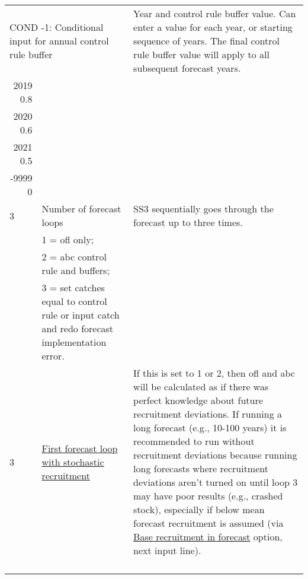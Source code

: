 \begin{landscape}
{\begin{longtable}{p{2cm} p{7cm} p{12cm}}
  \hline
  \multicolumn{2}{l}{COND -1: Conditional input for annual control rule buffer} & \multirow{1}{1cm}[-0.25cm]{\parbox{12cm}{Year and control rule buffer value. Can enter a value for each year, or starting sequence of years. The final control rule buffer value will apply to all subsequent forecast years.}} \\
  \multicolumn{1}{r}{2019 0.8} & & \\
  \multicolumn{1}{r}{2020 0.6} & & \\ 
  \multicolumn{1}{r}{2021 0.5} & & \\ 
  \multicolumn{1}{r}{-9999 0} & & \\ 

  \hline
  3 \Tstrut & Number of forecast loops & \multirow{1}{1cm}[-0.25cm]{\parbox{12cm}{SS3 sequentially goes through the forecast up to three times.}} \\
    & 1 = \gls{ofl} only; & \\
    & 2 = \gls{abc} control rule and buffers; & \\
    & 3 = set catches equal to control rule or input catch and redo forecast implementation error. & \Bstrut\\

  \hline
  3 \Tstrut & \hyperlink{appendB}{First forecast loop with stochastic recruitment} & \multirow{1}{1cm}[-0.25cm]{\parbox{12cm}{If this is set to 1 or 2, then \gls{ofl} and \gls{abc} will be calculated as if there was perfect knowledge about future recruitment deviations. If running a long forecast (e.g., 10-100 years) it is recommended to run without recruitment deviations because running long forecasts where recruitment deviations aren't turned on until loop 3 may have poor results (e.g., crashed stock), especially if below mean forecast recruitment is assumed (via \hyperlink{FcastRecruitment}{Base recruitment in forecast} option, next input line).}} \Bstrut\\
    & & \\
    & & \\
    & & \\
    & & \Bstrut\\


\end{longtable}}
\end{landscape}
